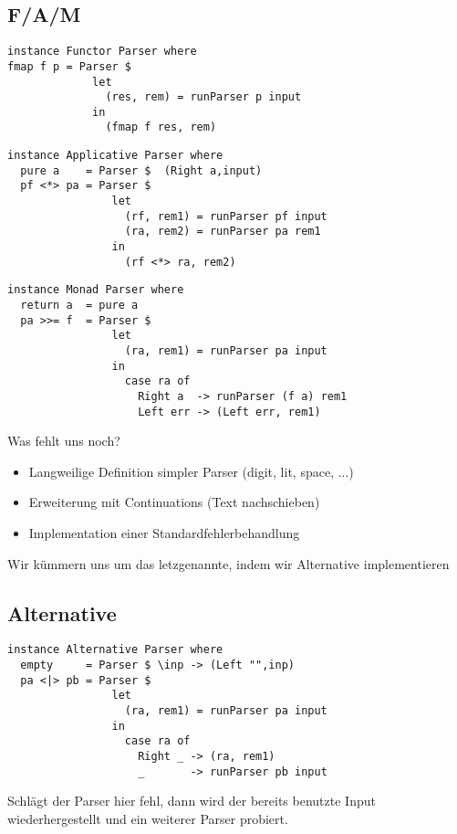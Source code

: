 \documentclass{beamer}
\begin{document}
\subsection{F/A/M}
\begin{frame}[fragile]
\begin{verbatim}
instance Functor Parser where
fmap f p = Parser $ 
             let
               (res, rem) = runParser p input
             in
               (fmap f res, rem)
\end{verbatim}
\end{frame}

\begin{frame}[fragile]
\begin{verbatim}
instance Applicative Parser where
  pure a    = Parser $  (Right a,input)
  pf <*> pa = Parser $ 
                let
                  (rf, rem1) = runParser pf input
                  (ra, rem2) = runParser pa rem1
                in
                  (rf <*> ra, rem2)
\end{verbatim}
\end{frame}

\begin{frame}[fragile]
\begin{verbatim}
instance Monad Parser where
  return a  = pure a
  pa >>= f  = Parser $ 
                let
                  (ra, rem1) = runParser pa input
                in
                  case ra of
                    Right a  -> runParser (f a) rem1
                    Left err -> (Left err, rem1)
\end{verbatim}
\end{frame}

\begin{frame}[fragile]
Was fehlt uns noch?\\
\pause
\begin{itemize}
 \item Langweilige Definition simpler Parser (digit, lit, space, ...)
 \item Erweiterung mit Continuations (Text \glqq nachschieben\grqq)
 \item Implementation einer Standardfehlerbehandlung
\end{itemize}
\pause
Wir kümmern uns um das letzgenannte, indem wir Alternative implementieren
\end{frame}

\subsection{Alternative}
\begin{frame}[fragile]
\begin{verbatim}
instance Alternative Parser where
  empty     = Parser $ \inp -> (Left "",inp)
  pa <|> pb = Parser $  
                let
                  (ra, rem1) = runParser pa input
                in
                  case ra of
                    Right _ -> (ra, rem1)
                    _       -> runParser pb input
\end{verbatim}
Schlägt der Parser hier fehl, dann wird der bereits benutzte Input wiederhergestellt und ein weiterer Parser probiert.
\end{frame}
\end{document}
